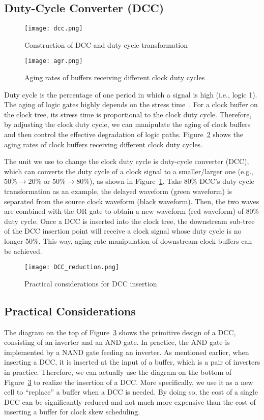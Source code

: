 \subsection{Duty-Cycle Converter (DCC)}
\begin{figure}
    \centering
    \texttt{[image: dcc.png]}
    \caption{Construction of DCC and duty cycle transformation}
    \label{fig:dcc}
\end{figure}

\begin{figure}
    \centering
    \texttt{[image: agr.png]}
    \caption{Aging rates of buffers receiving different clock duty cycles}
    \label{fig:agr}
\end{figure}

Duty cycle is the percentage of one period in which a signal is high (i.e., logic 1). The aging of logic gates highly depends on the stress time~\cite{wang2010impact}. For a clock buffer on the clock tree, its stress time is proportional to the clock duty cycle. Therefore, by adjusting the clock duty cycle, we can manipulate the aging of clock buffers and then control the effective degradation of logic paths. Figure~\ref{fig:agr} shows the aging rates of clock buffers receiving different clock duty cycles. 

The unit we use to change the clock duty cycle is duty-cycle converter (DCC), which can converts the duty cycle of a clock signal to a smaller/larger one (e.g., $50\% \rightarrow 20\%$ or $50\% \rightarrow 80\%$), as shown in Figure~\ref{fig:dcc}. Take 80\% DCC's duty cycle transformation as an example, the delayed waveform (green waveform) is separated from the source clock waveform (black waveform). Then, the two waves are combined with the OR gate to obtain a new waveform (red waveform) of 80\% duty cycle. Once a DCC is inserted into the clock tree, the downstream sub-tree of the DCC insertion point will receive a clock signal whose duty cycle is no longer 50\%. This way, aging rate manipulation of downstream clock buffers can be achieved.


\begin{figure}
    \centering
    \texttt{[image: DCC\_reduction.png]}
    \caption{Practical considerations for DCC insertion}
    \label{fig:dccreduc}
\end{figure}

\subsection{Practical Considerations}
\label{subsec:tpc}
The diagram on the top of Figure~\ref{fig:dccreduc} shows the primitive design of a DCC, consisting of an inverter and an AND gate. In practice, the AND gate is implemented by a NAND gate feeding an inverter. As mentioned earlier, when inserting a DCC, it is inserted at the input of a buffer, which is a pair of inverters in practice. Therefore, we can actually use the diagram on the bottom of Figure~\ref{fig:dccreduc} to realize the insertion of a DCC. More specifically, we use it as a new cell to \enquote{replace} a buffer when a DCC is needed. By doing so, the cost of a single DCC can be significantly reduced and not much more expensive than the cost of inserting a buffer for clock skew scheduling. 
